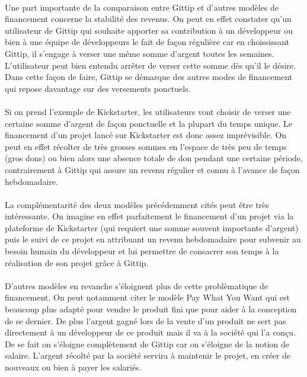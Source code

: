 \paragraph{}
Une part importante de la comparaison entre Gittip et d'autres modèles de
financement concerne la stabilité des revenus. On peut en effet constater qu'un
utilisateur de Gittip qui souhaite apporter sa contribution à un développeur ou
bien à une équipe de développeurs le fait de façon régulière car en
choississant
Gittip, il s'engage à verser une même somme d'argent toutes les semaines.
L'utilisateur peut bien entendu arrêter de verser cette somme dès qu'il le
désire. Dans cette façon de faire, Gittip se démarque des autres modes de
financement qui repose davantage sur des versements ponctuels. 

\paragraph{}
Si on prend l'exemple de Kickstarter, les utilisateurs vont choisir de verser
une certaine somme d'argent de façon ponctuelle et la plupart du temps unique.
Le financement d'un projet lancé sur Kickstarter est donc assez imprévisible.
On peut en effet récolter de très grosses sommes en l'espace de très peu de
temps
(gros dons) ou bien alors une absence totale de don pendant une certaine
période, contrairement à Gittip qui assure un revenu régulier et connu à
l'avance de façon hebdomadaire.

\paragraph{}
La complémentarité des deux modèles précédemment cités peut être très
intéressante. On
imagine en effet parfaitement le financement d'un projet via la plateforme de
Kickstarter (qui requiert une somme souvent importante d'argent) puis le suivi
de ce projet en attribuant un revenu hebdomadaire pour subvenir au besoin
humain du développeur et lui permettre de consacrer son temps à la réalisation
de son projet grâce à Gittip.

\paragraph{}
D'autres modèles en revanche s'éloignent plus de cette problèmatique de
financement. On peut notamment citer le modèle Pay What You Want qui est
beaucoup plus adapté pour vendre le produit fini que pour aider à la conception
de se dernier. De plus l'argent gagné lors de la vente d'un produit ne sert pas
directement à un développeur de ce produit mais il va à la société qui l'a
conçu. De se fait on s'éloigne complètement de Gittip car on s'éloigne de la
notion de salaire. L'argent récolté par la société servira à maintenir le
projet, en créer de nouveaux ou bien à payer les salariés.

